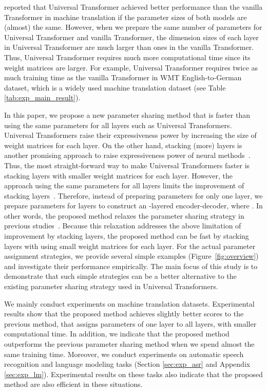 \documentclass[11pt]{article}
\begin{document}
\citet{dehghani2019} reported that Universal Transformer achieved better performance than the vanilla Transformer in machine translation if the parameter sizes of both models are (almost) the same.
However, when we prepare the same number of parameters for Universal Transformer and vanilla Transformer, the dimension sizes of each layer in Universal Transformer are much larger than ones in the vanilla Transformer.
Thus, Universal Transformer requires much more computational time since its weight matrices are larger.
For example, Universal Transformer requires twice as much training time as the vanilla Transformer in WMT English-to-German dataset, which is a widely used machine translation dataset (see Table \ref{tab:exp_main_result}).


In this paper, we propose a new parameter sharing method that is faster than using the same parameters for all layers such as Universal Transformers.
Universal Transformers raise their expressiveness power by increasing the size of weight matrices for each layer.
On the other hand, stacking (more) layers is another promising approach to raise expressiveness power of neural methods~\cite{7780459}.
Thus, the most straight-forward way to make Universal Transformers faster is stacking layers with smaller weight matrices for each layer.
However, the approach using the same parameters for all layers limits the improvement of stacking layers~\cite{Dabre_Fujita_2019}.
Therefore, instead of preparing parameters for only one layer, we prepare parameters for  layers to construct an -layered encoder-decoder, where .
In other words, the proposed method relaxes the parameter sharing strategy in previous studies~\cite{dehghani2019,Dabre_Fujita_2019,lan2020}.
Because this relaxation addresses the above limitation of improvement by stacking layers, the proposed method can be fast by stacking layers with using small weight matrices for each layer.
For the actual parameter assignment strategies, we provide several simple examples (Figure~\ref{fig:overview}) and investigate their performance empirically.
The main focus of this study is to demonstrate that such simple strategies can be a better alternative to the existing parameter sharing strategy used in Universal Transformers.


We mainly conduct experiments on machine translation datasets.
Experimental results show that the proposed method achieves slightly better scores to the previous method, that assigns parameters of one layer to all layers, with smaller computational time.
In addition, we indicate that the proposed method outperforms the previous parameter sharing method when we spend almost the same training time.
Moreover, we conduct experiments on automatic speech recognition and language modeling tasks (Section \ref{sec:exp_asr} and Appendix \ref{sec:exp_lm}).
Experimental results on these tasks also indicate that the proposed method are also efficient in these situations.
\end{document}
